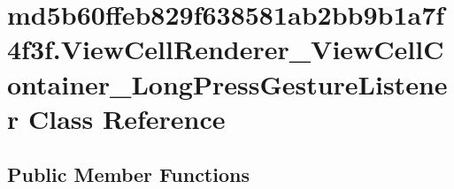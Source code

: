 \hypertarget{classmd5b60ffeb829f638581ab2bb9b1a7f4f3f_1_1_view_cell_renderer___view_cell_container___long_press_gesture_listener}{
\section{md5b60ffeb829f638581ab2bb9b1a7f4f3f.ViewCellRenderer\_\-ViewCellContainer\_\-LongPressGestureListener Class Reference}
\label{classmd5b60ffeb829f638581ab2bb9b1a7f4f3f_1_1_view_cell_renderer___view_cell_container___long_press_gesture_listener}
}
\subsection*{Public Member Functions}
